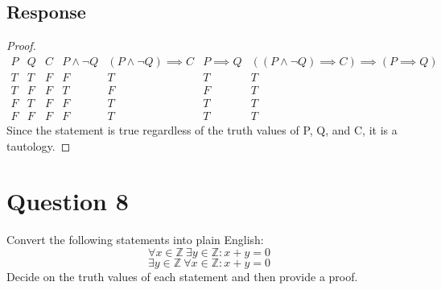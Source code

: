 \documentclass[13pt]{article}
\begin{document}
\subsection*{Response}
\begin{proof}
  \[
    \begin{array}{c|c|c|c|c|c|c}
      P & Q & C & P \land \neg Q & (P \land \neg Q) \implies C & P \implies Q & ((P \land \neg Q) \implies C)
                                                                                \implies (P \implies Q) \\
      \hline
      T & T & F & F & T & T & T \\
      T & F & F & T & F & F & T \\
      F & T & F & F & T & T & T \\
      F & F & F & F & T & T & T 
    \end{array}
  \]
  Since the statement is true regardless of the truth values of P, Q, and C, it is a tautology.
\end{proof}





\newpage
\section*{Question 8}
Convert the following statements into plain English:
\[\forall x \in \mathbb{Z} \ \exists y \in \mathbb{Z} : x + y = 0\]
\[\exists y \in \mathbb{Z} \ \forall x \in \mathbb{Z} : x + y = 0\]
Decide on the truth values of each statement and then provide a proof.
\end{document}
